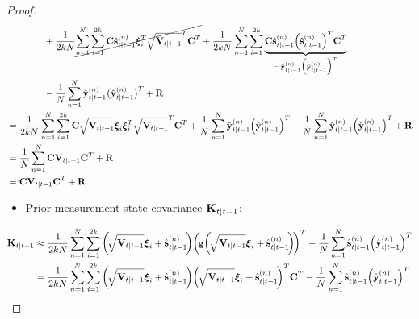 \begin{proof}
\begin{align*}
						&\qquad\qquad + \frac{1}{2kN} \cancel{\sum_{n = 1}^{N} \sum_{i = 1}^{2k} \boldsymbol{\mathrm{C}} \hat{\boldsymbol{\mathrm{s}}}_{t \vert t - 1}^{(n)} \boldsymbol{\mathrm{\xi}}_i^T \sqrt{\boldsymbol{\mathrm{V}}_{t \vert t - 1}}^T \boldsymbol{\mathrm{C}}^T} + \frac{1}{2kN} \sum_{n = 1}^{N} \sum_{i = 1}^{2k} \underbrace{\boldsymbol{\mathrm{C}} \hat{\boldsymbol{\mathrm{s}}}_{t \vert t - 1}^{(n)} \Big(\hat{\boldsymbol{\mathrm{s}}}_{t \vert t - 1}^{(n)}\Big)^T \boldsymbol{\mathrm{C}}^T}_{=\, \hat{\boldsymbol{\mathrm{y}}}_{t \vert t - 1}^{(n)} \Big( \hat{\boldsymbol{\mathrm{y}}}_{t \vert t - 1}^{(n)} \Big)^T} \\
						&\qquad\qquad - \frac{1}{N} \sum_{n = 1}^{N} \hat{\boldsymbol{\mathrm{y}}}_{t \vert t - 1}^{(n)} \big( \hat{\boldsymbol{\mathrm{y}}}_{t \vert t - 1}^{(n)} \big)^T + \boldsymbol{\mathrm{R}} \\
					&= \frac{1}{2kN} \sum_{n = 1}^{N} \sum_{i = 1}^{2k} \boldsymbol{\mathrm{C}} \sqrt{\boldsymbol{\mathrm{V}}_{t \vert t - 1}} \boldsymbol{\mathrm{\xi}}_i \boldsymbol{\mathrm{\xi}}_i^T \sqrt{\boldsymbol{\mathrm{V}}_{t \vert t - 1}}^T \boldsymbol{\mathrm{C}}^T + \frac{1}{N} \sum_{n = 1}^{N} \hat{\boldsymbol{\mathrm{y}}}_{t \vert t - 1}^{(n)} \Big( \hat{\boldsymbol{\mathrm{y}}}_{t \vert t - 1}^{(n)} \Big)^T - \frac{1}{N} \sum_{n = 1}^{N} \hat{\boldsymbol{\mathrm{y}}}_{t \vert t - 1}^{(n)} \Big( \hat{\boldsymbol{\mathrm{y}}}_{t \vert t - 1}^{(n)} \Big)^T + \boldsymbol{\mathrm{R}} \\
					&= \frac{1}{N} \sum_{n = 1}^{N} \boldsymbol{\mathrm{C}} \boldsymbol{\mathrm{V}}_{t \vert t - 1} \boldsymbol{\mathrm{C}}^T + \boldsymbol{\mathrm{R}} \\
					&= \boldsymbol{\mathrm{C}} \boldsymbol{\mathrm{V}}_{t \vert t - 1} \boldsymbol{\mathrm{C}}^T + \boldsymbol{\mathrm{R}}
			\end{align*}
			\begin{itemize}
				\item Prior measurement-state covariance \( \boldsymbol{\mathrm{K}}_{t \vert t - 1} \):
			\end{itemize}
			\begin{align*}
				\mat{K}_{t \subgiven t - 1}
					&\approx \frac{1}{2kN} \sum_{n = 1}^{N} \sum_{i = 1}^{2k} \bigg(\!\sqrt{\mat{V}_{t \subgiven t - 1}} \vec{\xi}_i + \hat{\vec{s}}_{t \subgiven t - 1}^{(n)}\!\bigg) \bigg(\!\vec{g}\bigg(\!\sqrt{\mat{V}_{t \subgiven t - 1}} \vec{\xi}_i + \hat{\vec{s}}_{t \subgiven t - 1}^{(n)}\!\bigg)\!\bigg)^T - \frac{1}{N} \sum_{n = 1}^{N} \hat{\vec{s}}_{t \subgiven t - 1}^{(n)} \Big( \hat{\vec{y}}_{t \subgiven t - 1}^{(n)} \Big)^T \\
					&= \frac{1}{2kN} \sum_{n = 1}^{N} \sum_{i = 1}^{2k} \bigg(\!\sqrt{\mat{V}_{t \subgiven t - 1}} \vec{\xi}_i + \hat{\vec{s}}_{t \subgiven t - 1}^{(n)}\!\bigg) \bigg(\!\sqrt{\mat{V}_{t \subgiven t - 1}} \vec{\xi}_i + \hat{\vec{s}}_{t \subgiven t - 1}^{(n)}\!\bigg)^T \mat{C}^T - \frac{1}{N} \sum_{n = 1}^{N} \hat{\vec{s}}_{t \subgiven t - 1}^{(n)} \Big( \hat{\vec{y}}_{t \subgiven t - 1}^{(n)} \Big)^T \\

\end{align*}
\end{proof}

